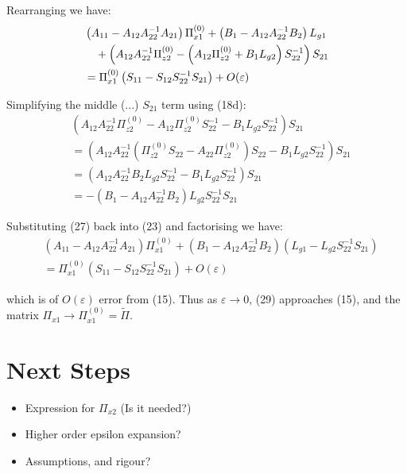 \documentclass{article}
\begin{document}
Rearranging we have: 
\begin{align}
& \left( A_{11} - A_{12} A_{22}^{-1} A_{21} \right) \Pi_{x1}^{(0)}
+ \left( B_1 - A_{12} A_{22}^{-1} B_2 \right)L_{g1} \notag\\
& \quad + \left( A_{12} A_{22}^{-1} \Pi_{z2}^{(0)} - \left( A_{12} \Pi_{z2}^{(0)} + B_1 L_{g2} \right) S_{22} ^{-1} \right) S_{21} \notag\\
&= \Pi_{x1}^{(0)} \left( S_{11} - S_{12} S_{22} ^{-1} S_{21} \right) + O(\varepsilon)
\end{align}

Simplifying the middle (...) $S_{21}$ term using (18d):
\begin{align}
    & \left( A_{12} A_{22} ^ {-1} \Pi_{z2} ^ {(0)} - A_{12} \Pi_{z2} ^{(0)} S_{22}^{-1}  - B_1 L_{g2} S_{22}^{-1} \right) S_{21} \\
    &= \left( A_{12} A_{22} ^ {-1} \left( \Pi_{z2}^{(0)} S_{22} - A_{22} \Pi_{z2} ^ {(0)} \right) S_{22} - B_1 L_{g2} S_{22}^{-1} \right) S_{21} \\
    &= \left( A_{12} A_{22}^{-1} B_2 L_{g2} S_{22}^{-1} - B_1 L_{g2} S_{22}^{-1} \right) S_{21} \\
    &= - \left( B_1 - A_{12} A_{22}^{-1} B_2 \right) L_{g2} S_{22}^{-1} S_{21}
\end{align}

Substituting (27) back into (23) and factorising we have: 
\begin{align}
    &\left( A_{11} - A_{12} A_{22}^{-1} A_{21} \right) \Pi_{x1}^{(0)} + (B_1 - A_{12} A_{22}^{-1} B_2) (L_{g1} - L_{g2} S_{22} ^ {-1} S_{21}) \\
    &= \Pi_{x1}^{(0)} \left( S_{11} - S_{12} S_{22} ^{-1} S_{21} \right) + O(\varepsilon)
\end{align}

which is of $O(\varepsilon)$ error from (15). 
Thus as $\varepsilon \to 0$, (29) approaches (15), and the matrix $\Pi_{x1}  \to \Pi_{x1}^{(0)} = \tilde{\Pi}$.

\section{Next Steps}
\begin{itemize}
    \item Expression for $\Pi_{x2}$ (Is it needed?)
    \item Higher order epsilon expansion?
    \item Assumptions, and rigour?
\end{itemize}
\end{document}
